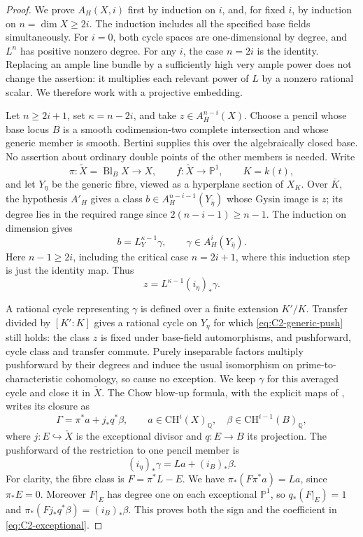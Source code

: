 \begin{proof}
We prove $A_H(X,i)$ first by induction on $i$, and, for fixed $i$,
by induction on $n=\dim X\ge2i$. The induction includes all the
specified base fields simultaneously. For $i=0$, both cycle spaces are
one-dimensional by degree, and $L^n$ has positive nonzero degree.
For any $i$, the case $n=2i$ is the identity. Replacing an ample line
bundle by a sufficiently high very ample power does not change the
assertion: it multiplies each relevant power of $L$ by a nonzero
rational scalar. We therefore work with a projective embedding.

Let $n\ge2i+1$, set $\kappa=n-2i$, and take
$z\in A_H^{n-i}(X)$. Choose a pencil whose base locus $B$ is a smooth
codimension-two complete intersection and whose generic member is
smooth. Bertini supplies this over the algebraically closed base.
No assertion about ordinary double points of the other members is
needed. Write
\[
 \pi:\widetilde X=\operatorname{Bl}_B X\longrightarrow X,
 \qquad f:\widetilde X\longrightarrow\mathbb P^1,
 \qquad K=k(t),
\]
and let $Y_\eta$ be the generic fibre, viewed as a hyperplane section of
$X_K$. Over $\overline K$, the hypothesis $A'_H$ gives a class
$b\in A_H^{n-i-1}(Y_{\overline\eta})$ whose Gysin image is $z$;
its degree lies in the required range since
$2(n-i-1)\ge n-1$. The induction on dimension gives
\[
 b=L_Y^{\kappa-1}\gamma,
 \qquad \gamma\in A_H^i(Y_{\overline\eta}).
\]
Here $n-1\ge2i$, including the critical case $n=2i+1$, where this
induction step is just the identity map. Thus
\begin{equation}\label{eq:C2-generic-push}
             z=L^{\kappa-1}(i_\eta)_*\gamma.
\end{equation}

A rational cycle representing $\gamma$ is defined over a finite
extension $K'/K$. Transfer divided by $[K':K]$ gives a rational cycle
on $Y_\eta$ for which \eqref{eq:C2-generic-push} still holds: the
class $z$ is fixed under base-field automorphisms, and pushforward,
cycle class and transfer commute. Purely inseparable factors multiply
pushforward by their degrees and induce the usual isomorphism on
prime-to-characteristic cohomology, so cause no exception. We keep
$\gamma$ for this averaged cycle and close it in $\widetilde X$.
The Chow blow-up formula, with the explicit maps of
\citet[Theorem 2.8(3)]{cyJiang2023}, writes its closure as
\[
 \Gamma=\pi^*a+j_*q^*\beta,
 \qquad a\in\mathrm{CH}^i(X)_{\mathbb Q},\quad
 \beta\in\mathrm{CH}^{i-1}(B)_{\mathbb Q},
\]
where $j:E\hookrightarrow\widetilde X$ is the exceptional divisor
and $q:E\to B$ its projection. The pushforward of the restriction to
one pencil member is
\begin{equation}\label{eq:C2-exceptional}
                  (i_\eta)_*\gamma=L a+(i_B)_*\beta.
\end{equation}
For clarity, the fibre class is $F=\pi^*L-E$.
We have $\pi_*(F\pi^*a)=La$, since $\pi_*E=0$.
Moreover $F|_E$ has degree one on each exceptional $\mathbb P^1$,
so $q_*(F|_E)=1$ and
$\pi_*(Fj_*q^*\beta)=(i_B)_*\beta$.
This proves both the sign and the coefficient in
\eqref{eq:C2-exceptional}.


\end{proof}
